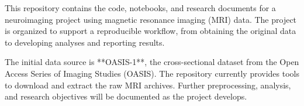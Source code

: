 This repository contains the code, notebooks, and research documents for a neuroimaging project using magnetic resonance imaging (MRI) data. The project is organized to support a reproducible workflow, from obtaining the original data to developing analyses and reporting results.

The initial data source is **OASIS-1**, the cross-sectional dataset from the Open Access Series of Imaging Studies (OASIS). The repository currently provides tools to download and extract the raw MRI archives. Further preprocessing, analysis, and research objectives will be documented as the project develops.